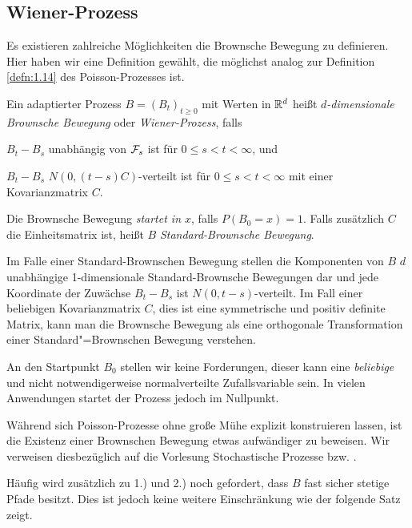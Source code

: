 \subsection{Wiener-Prozess}

Es existieren zahlreiche Möglichkeiten die Brownsche Bewegung zu definieren.
Hier haben wir eine Definition gewählt, die möglichst analog zur Definition
\ref{defn:1.14} des Poisson-Prozesses ist.

\begin{defn}
\label{defn:1.15}
Ein adaptierter Prozess $B=(B_t)_{t \ge 0}$ mit Werten in $\mathbb{R}^d$ heißt
\emph{$d$-dimensionale Brownsche Bewegung} oder \emph{Wiener-Prozess}, falls
\begin{defnenum}
\item $B_t-B_s$ unabhängig von
  $\mathcal{F}_s$ ist für $0 \le s < t < \infty$, und
\item $B_t-B_s$ $N(0,(t-s)C)$-verteilt ist für $0 \le s < t < \infty$ mit einer
Kovarianzmatrix $C$.
\end{defnenum}
Die Brownsche Bewegung \emph{startet in $x$}, falls $P(B_0=x)=1$.
Falls zusätzlich $C$ die Einheitsmatrix ist, heißt $B$ \emph{Standard-Brownsche
Bewegung}.\fish
\end{defn}

Im Falle einer Standard-Brownschen Bewegung stellen die Komponenten von $B$
$d$ unabhängige 1-dimensionale Standard-Brownsche Bewegungen dar und jede
Koordinate der Zuwächse $B_t-B_s$ ist $N(0,t-s)$-verteilt.
Im Fall einer beliebigen Kovarianzmatrix $C$, dies ist eine symmetrische und
positiv definite Matrix, kann man die Brownsche Bewegung als eine orthogonale
Transformation einer Standard"=Brownschen Bewegung verstehen.

An den Startpunkt $B_0$ stellen wir keine Forderungen, dieser kann eine
\textit{beliebige} und nicht notwendigerweise normalverteilte Zufallsvariable
sein. In vielen Anwendungen startet der Prozess jedoch im Nullpunkt.

Während sich Poisson-Prozesse ohne große Mühe explizit konstruieren lassen, 
ist die Existenz einer Brownschen Bewegung etwas aufwändiger zu beweisen. Wir
verweisen diesbezüglich auf die Vorlesung
Stochastische Prozesse bzw. \cite[Anhang~A.4]{Meintrup:2004wga}.

Häufig wird zusätzlich zu 1.) und 2.) noch gefordert, dass $B$ fast sicher
stetige Pfade besitzt. Dies ist jedoch keine weitere Einschränkung wie der
folgende Satz zeigt.


